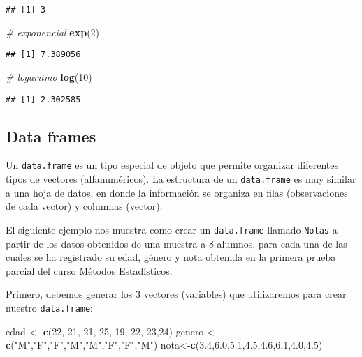 \documentclass[]{book}
\newenvironment{Shaded}{\begin{snugshade}}{\end{snugshade}}
\newcommand{\CommentTok}[1]{\textcolor[rgb]{0.56,0.35,0.01}{\textit{#1}}}
\newcommand{\DecValTok}[1]{\textcolor[rgb]{0.00,0.00,0.81}{#1}}
\newcommand{\FloatTok}[1]{\textcolor[rgb]{0.00,0.00,0.81}{#1}}
\newcommand{\KeywordTok}[1]{\textcolor[rgb]{0.13,0.29,0.53}{\textbf{#1}}}
\newcommand{\NormalTok}[1]{#1}
\newcommand{\StringTok}[1]{\textcolor[rgb]{0.31,0.60,0.02}{#1}}
\begin{document}
\begin{verbatim}
## [1] 3
\end{verbatim}

\begin{Shaded}
\begin{Highlighting}[]
\CommentTok{# exponencial}
\KeywordTok{exp}\NormalTok{(}\DecValTok{2}\NormalTok{)}
\end{Highlighting}
\end{Shaded}

\begin{verbatim}
## [1] 7.389056
\end{verbatim}

\begin{Shaded}
\begin{Highlighting}[]
\CommentTok{# logaritmo}
\KeywordTok{log}\NormalTok{(}\DecValTok{10}\NormalTok{)}
\end{Highlighting}
\end{Shaded}

\begin{verbatim}
## [1] 2.302585
\end{verbatim}

\hypertarget{data-frames}{%
\subsection{Data frames}\label{data-frames}}

Un \texttt{data.frame} es un tipo especial de objeto que permite organizar diferentes tipos de vectores
(alfanuméricos). La estructura de un \texttt{data.frame} es muy similar a una hoja de datos, en donde la información
se organiza en filas (observaciones de cada vector) y columnas (vector).

El siguiente ejemplo nos muestra como crear un \texttt{data.frame} llamado \texttt{Notas} a partir de los datos obtenidos de una muestra a 8 alumnos, para cada una de las cuales se ha registrado su edad, género y nota obtenida en la primera prueba parcial del curso Métodos Estadísticos.

Primero, debemos generar los 3 vectores (variables) que utilizaremos para crear nuestro \texttt{data.frame}:

\begin{Shaded}
\begin{Highlighting}[]
\NormalTok{edad <-}\StringTok{ }\KeywordTok{c}\NormalTok{(}\DecValTok{22}\NormalTok{, }\DecValTok{21}\NormalTok{, }\DecValTok{21}\NormalTok{, }\DecValTok{25}\NormalTok{, }\DecValTok{19}\NormalTok{, }\DecValTok{22}\NormalTok{, }\DecValTok{23}\NormalTok{,}\DecValTok{24}\NormalTok{)}
\NormalTok{genero <-}\StringTok{ }\KeywordTok{c}\NormalTok{(}\StringTok{"M"}\NormalTok{,}\StringTok{"F"}\NormalTok{,}\StringTok{"F"}\NormalTok{,}\StringTok{"M"}\NormalTok{,}\StringTok{"M"}\NormalTok{,}\StringTok{"F"}\NormalTok{,}\StringTok{"F"}\NormalTok{,}\StringTok{"M"}\NormalTok{)}
\NormalTok{nota<-}\KeywordTok{c}\NormalTok{(}\FloatTok{3.4}\NormalTok{,}\FloatTok{6.0}\NormalTok{,}\FloatTok{5.1}\NormalTok{,}\FloatTok{4.5}\NormalTok{,}\FloatTok{4.6}\NormalTok{,}\FloatTok{6.1}\NormalTok{,}\FloatTok{4.0}\NormalTok{,}\FloatTok{4.5}\NormalTok{)}
\end{Highlighting}
\end{Shaded}
\end{document}

